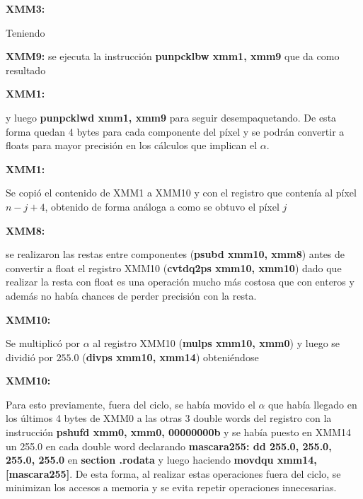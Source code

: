 \clearpage
\par{\textbf{XMM3:}}

Teniendo
\par{\textbf{XMM9:}}
se ejecuta la instrucción \textbf{punpcklbw xmm1, xmm9} que da como resultado
\par{\textbf{XMM1:}}
\par{y luego \textbf{punpcklwd xmm1, xmm9} para seguir desempaquetando. De esta forma quedan 4 bytes para cada componente del píxel y se podrán convertir a floats para mayor precisión en los cálculos que implican el $\alpha$.}
\par{\textbf{XMM1:}}
\par{Se copió el contenido de XMM1 a XMM10 y con el registro que contenía al píxel $n-j+4$, obtenido de forma análoga a como se obtuvo el píxel $j$}
\par{\textbf{XMM8:}}
\par{se realizaron las restas entre componentes (\textbf{psubd xmm10, xmm8}) antes de convertir a float el registro XMM10 (\textbf{cvtdq2ps xmm10, xmm10}) dado que realizar la resta con float es una operación mucho más costosa que con enteros y además no había chances de perder precisión con la resta.}
\par{\textbf{XMM10:}}
\par{Se multiplicó por $\alpha$ al registro XMM10 (\textbf{mulps xmm10, xmm0}) y luego se dividió por $255.0$ (\textbf{divps xmm10, xmm14}) obteniéndose}
\par{\textbf{XMM10:}}
\par{Para esto previamente, fuera del ciclo, se había movido el $\alpha$ que había llegado en los últimos 4 bytes de XMM0 a las otras 3 double words del registro con la instrucción \textbf{pshufd xmm0, xmm0, 00000000b} y se había puesto en XMM14 un 255.0 en cada double word declarando \textbf{mascara255: dd 255.0, 255.0, 255.0, 255.0} en \textbf{section .rodata} y luego haciendo \textbf{movdqu xmm14, [mascara255]}. De esta forma, al realizar estas operaciones fuera del ciclo, se minimizan los accesos a memoria y se evita repetir operaciones innecesarias.}
